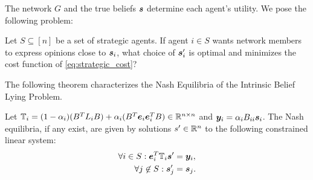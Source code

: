 The network $G$ and the true beliefs $\bm{s}$ determine each agent’s utility. We pose the following problem: 

\begin{defn} \label{defn:lying}
Let $S \subseteq [n]$ be a set of strategic agents. If agent $i \in S$ wants network members to express opinions close to $\bm{s}_i$, what choice of $\bm{s}_i^\prime$ is optimal and minimizes the cost function of \cref{eq:strategic_cost}? 
\end{defn}

The following theorem characterizes the Nash Equilibria of the Intrinsic Belief Lying Problem. 
\begin{theorem} \label{theorem:psne}
Let $\mathbb T_i = (1 - \alpha_i) (B^T L_i B) + \alpha_i (B^T \bm{e}_i \bm{e}_i^T B) \in \mathbb{R}^{n \times n}$ and $\bm{y}_i = \alpha_i B_{ii} \bm{s}_i$. The Nash equilibria, if any exist, are given by solutions $s^\prime \in \mathbb{R}^n$ to the following constrained linear system: 
\begin{align*}
\forall i \in S: \bm{e}_i^T \mathbb T_i \bm{s}^\prime & = \bm{y}_i, \\
\forall j \not \in S: \bm{s}_j^\prime & = \bm{s}_j. 
\end{align*}
\end{theorem}

